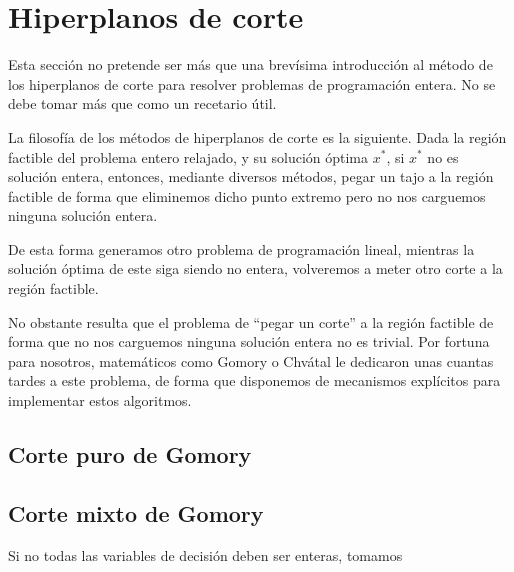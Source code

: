 \section{Hiperplanos de corte}
Esta sección no pretende ser más que una brevísima introducción al método de los hiperplanos de corte para resolver problemas de programación entera. No se debe tomar más que como un recetario útil.

\begin{obs}[Filosofía]
	La filosofía de los métodos de hiperplanos de corte es la siguiente. Dada la región factible del problema entero relajado, y su solución óptima $x^*$, si $x^*$ no es solución entera, entonces, mediante diversos métodos, pegar un tajo a la región factible de forma que eliminemos dicho punto extremo pero no nos carguemos ninguna solución entera.
	
	De esta forma generamos otro problema de programación lineal, mientras la solución óptima de este siga siendo no entera, volveremos a meter otro corte a la región factible.
\end{obs}
No obstante resulta que el problema de ``pegar un corte'' a la región factible de forma que no nos carguemos ninguna solución entera no es trivial. Por fortuna para nosotros, matemáticos como Gomory o Chvátal le dedicaron unas cuantas tardes a este problema, de forma que disponemos de mecanismos explícitos para implementar estos algoritmos.
\subsection{Corte puro de Gomory}

\subsection{Corte mixto de Gomory}
Si no todas las variables de decisión deben ser enteras, tomamos 